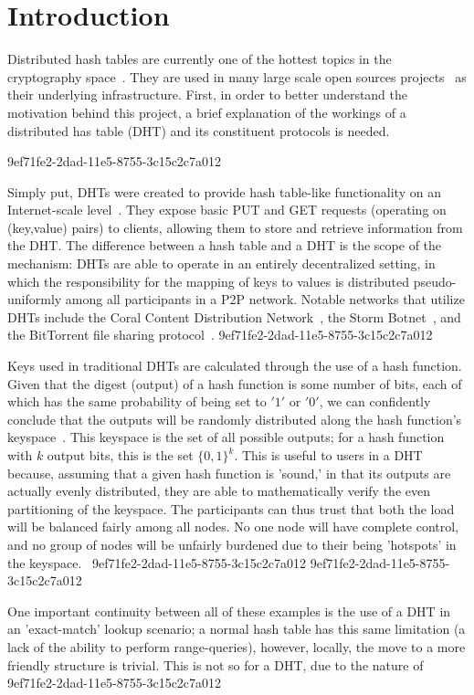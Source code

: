 \documentclass[12pt]{article}
\begin{document}
\section{Introduction}
\par Distributed hash tables are currently one of the hottest topics in the cryptography space~\cite{Stoica:2001dj,Rowstron:2001ea,Ratnasamy:2001wn}. They are used in many large scale open sources projects~\cite{Freitas:2013tb,Xu:2010vs,Perfitt:2010fh} as their underlying infrastructure. First, in order to better understand the motivation behind this project, a brief explanation of the workings of a distributed has table (DHT) and its constituent protocols is needed.

9ef71fe2-2dad-11e5-8755-3c15c2c7a012\par Simply put, DHTs were created to provide hash table-like functionality on an Internet-scale level~\cite{Ratnasamy:2001wn}. They expose basic PUT and GET requests (operating on (key,value) pairs) to clients, allowing them to store and retrieve information from the DHT. The difference between a hash table and a DHT is the scope of the mechanism: DHTs are able to operate in an entirely decentralized setting, in which the responsibility for the mapping of keys to values is distributed pseudo-uniformly among all participants in a P2P network. Notable networks that utilize DHTs include the Coral Content Distribution Network~\cite{Freedman:2004vb}, the Storm Botnet~\cite{Holz:2008uk}, and the BitTorrent file sharing protocol~\cite{Cohen:y1_8mBnw}.
9ef71fe2-2dad-11e5-8755-3c15c2c7a012
\par Keys used in traditional DHTs are calculated through the use of a hash function. Given that the digest (output) of a hash function is some number of bits, each of which has the same probability of being set to $'1'$ or $'0'$, we can confidently conclude that the outputs will be randomly distributed along the hash function's keyspace~. This keyspace is the set of all possible outputs; for a hash function with $k$ output bits, this is the set $\{0,1\}^k$. This is useful to users in a DHT because, assuming that a given hash function is 'sound,' in that its outputs are actually evenly distributed, they are able to mathematically verify the even partitioning of the keyspace. The participants can thus trust that both the load will be balanced fairly among all nodes. No one node will have complete control, and no group of nodes will be unfairly burdened due to their being 'hotspots' in the keyspace.~
9ef71fe2-2dad-11e5-8755-3c15c2c7a012
9ef71fe2-2dad-11e5-8755-3c15c2c7a012\par One important continuity between all of these examples is the use of a DHT in an 'exact-match' lookup scenario; a normal hash table has this same limitation (a lack of the ability to perform range-queries), however, locally, the move to a more friendly structure is trivial. This is not so for a DHT, due to the nature of
\printbibliography
9ef71fe2-2dad-11e5-8755-3c15c2c7a012
\end{document}
